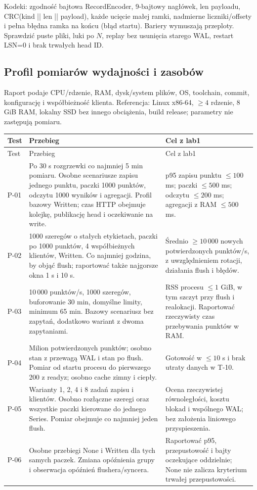 \documentclass[11pt,a4paper]{article}
\newcommand{\tabhead}[1]{\toprule #1\\ \midrule\endfirsthead
  \toprule #1\\ \midrule\endhead \bottomrule\endfoot}
\begin{document}
Kodeki: zgodność bajtowa RecordEncoder, 9-bajtowy nagłówek,
len payloadu, CRC(kind || len || payload), każde ucięcie małej ramki,
nadmierne liczniki/offsety i pełna błędna ramka na końcu (błąd startu).
Bariery wymuszają przeploty. Sprawdzić puste pliki, luki po $N$,
replay bez usunięcia starego WAL, restart LSN=0 i brak trwałych head ID.

\subsection{Profil pomiarów wydajności i zasobów}
Raport podaje CPU/rdzenie, RAM, dysk/system plików, OS, toolchain,
commit, konfigurację i współbieżność klienta. Referencja:
Linux x86-64, $\geq4$ rdzenie, 8 GiB RAM, lokalny SSD bez innego
obciążenia, build release; parametry nie zastępują pomiaru.

\begin{longtable}{P{20mm}P{73mm}P{63mm}}
\tabhead{Test & Przebieg & Cel z lab1}
P-01 & Po 30 s rozgrzewki co najmniej 5 min pomiaru. Osobne scenariusze
zapisu jednego punktu, paczki 1000 punktów, odczytu 1000 wyników i agregacji.
Profil bazowy Written; czas HTTP obejmuje kolejkę, publikację head
i oczekiwanie na write. &
p95 zapisu punktu $\leq100$ ms; paczki $\leq500$ ms;
odczytu $\leq200$ ms; agregacji z RAM $\leq500$ ms.\\
P-02 & 1000 szeregów o stałych etykietach, paczki po 1000 punktów,
4 współbieżnych klientów, Written. Co najmniej godzina, by objąć flush;
raportować także najgorsze okna 1 s i 10 s. &
Średnio $\geq10\,000$ nowych potwierdzonych punktów/s,
z uwzględnieniem rotacji, działania flush i błędów.\\
P-03 & 10\,000 punktów/s, 1000 szeregów, buforowanie 30 min,
domyślne limity, minimum 65 min. Bazowy scenariusz bez zapytań,
dodatkowo wariant z dwoma zapytaniami. &
RSS procesu $\leq1$ GiB, w tym szczyt przy flush i realokacji.
Raportować rzeczywisty czas przebywania punktów w RAM.\\
P-04 & Milion potwierdzonych punktów; osobno stan z przewagą WAL
i stan po flush. Pomiar od startu procesu do pierwszego 200 z readyz;
osobno cache zimny i ciepły. &
Gotowość w $\leq10$ s i brak utraty danych w T-10.\\
P-05 & Warianty 1, 2, 4 i 8 zadań zapisu i klientów.
Osobno rozłączne szeregi oraz wszystkie paczki kierowane do jednego Series.
Pomiar obejmuje co najmniej jeden flush. &
Ocena rzeczywistej równoległości, kosztu blokad i wspólnego WAL;
bez założenia liniowego przyspieszenia.\\
P-06 & Osobne przebiegi None i Written dla tych samych paczek.
Zmiana opóźnienia grupy i obserwacja opóźnień flushera/syncera. &
Raportować p95, przepustowość i bajty oczekujące oddzielnie;
None nie zalicza kryterium trwałej przepustowości.\\
\end{longtable}
\end{document}
